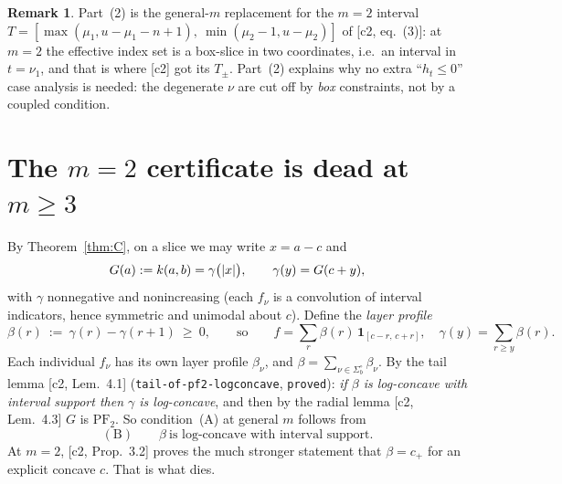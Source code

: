 \documentclass[11pt]{article}
\theoremstyle{definition}
\newtheorem{remark}[theorem]{Remark}
\newcommand{\PFtwo}{\mathrm{PF}_2}
\DeclarePairedDelimiter{\abs}{\lvert}{\rvert}
\begin{document}
\begin{remark}
Part~(2) is the general-$m$ replacement for the $m=2$ interval
$T=[\max(\mu_1,u-\mu_1-n+1),\ \min(\mu_2-1,u-\mu_2)]$ of [c2, eq.~(3)]: at $m=2$ the
effective index set is a box-slice in two coordinates, i.e.\ an interval in $t=\nu_1$, and
that is where [c2] got its $T_\pm$. Part~(2) explains why no extra ``$h_t\le0$'' case
analysis is needed: the degenerate $\nu$ are cut off by \emph{box} constraints, not by a
coupled condition.
\end{remark}

\section{The $m=2$ certificate is dead at $m\ge3$}\label{sec:dead}

By Theorem~\ref{thm:C}, on a slice we may write $x=a-c$ and
\[
  G(a):=k(a,b)=\gamma\bigl(\abs{x}\bigr),\qquad \gamma(y)=G(c+y),
\]
with $\gamma$ nonnegative and nonincreasing (each $f_\nu$ is a convolution of interval
indicators, hence symmetric and unimodal about $c$). Define the \emph{layer profile}
\[
  \beta(r)\ :=\ \gamma(r)-\gamma(r+1)\ \ge\ 0,
  \qquad\text{so}\qquad
  f=\sum_r\beta(r)\,\mathbf 1_{[c-r,\,c+r]},\quad \gamma(y)=\sum_{r\ge y}\beta(r).
\]
Each individual $f_\nu$ has its own layer profile $\beta_\nu$, and
$\beta=\sum_{\nu\in\Sigma^\circ_b}\beta_\nu$. By the tail lemma
[c2, Lem.~4.1] (\texttt{tail-of-pf2-logconcave}, \texttt{proved}): \emph{if $\beta$ is
log-concave with interval support then $\gamma$ is log-concave}, and then by the radial
lemma [c2, Lem.~4.3] $G$ is $\PFtwo$. So condition~(A) at general $m$ follows from
\[
  (\mathrm B)\qquad \beta\ \text{is log-concave with interval support.}
\]
At $m=2$, [c2, Prop.~3.2] proves the much stronger statement that $\beta=c_+$ for an
explicit concave $c$. That is what dies.
\end{document}
